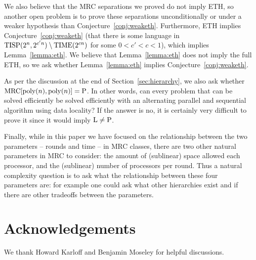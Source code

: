 \documentclass[11pt]{article}
\theoremstyle{definition}
\theoremstyle{remark}
\newcommand{\mrc}{\textup{MRC}}
\newcommand{\TIME}{\textup{TIME}}
\newcommand{\TISP}{\textup{TISP}}
\renewcommand{\P}{\textup{P}}
\renewcommand{\L}{\textup{L}}
\begin{document}
We also believe that the MRC separations we proved do not imply ETH, so another
open problem is to prove these separations unconditionally or under a weaker
hypothesis than Conjecture~\ref{conj:weaketh}. Furthermore, ETH implies
Conjecture~\ref{conj:weaketh} (that there is some language in $\TISP(2^n,
2^{c'n}) \setminus \TIME(2^{cn})$ for some $0 < c' < c < 1$), which implies
Lemma~\ref{lemma:eth}. We believe that Lemma~\ref{lemma:eth} does not imply the
full ETH, so we ask whether Lemma~\ref{lemma:eth} implies
Conjecture~\ref{conj:weaketh}.

As per the discussion at the end of Section~\ref{sec:hierarchy}, we also ask
whether $\mrc[\text{poly}(n), \text{poly}(n)] = \P$. In other words, can every
problem that can be solved efficiently be solved efficiently with an
alternating parallel and sequential algorithm using data locality? If the
answer is no, it is certainly very difficult to prove it since it would imply
$\L\neq\P$.

Finally, while in this paper we have focused on the relationship between the
two parameters -- rounds and time -- in MRC classes, there are two other
natural parameters in MRC to consider:  the amount of (sublinear) space allowed
each processor, and the (sublinear) number of processors per round. Thus a
natural complexity question is to ask what the relationship between these four
parameters are: for example one could ask what other hierarchies exist and if
there are other tradeoffs between the parameters.

\section*{Acknowledgements} We thank Howard Karloff and Benjamin Moseley for
helpful discussions.




\end{document}
